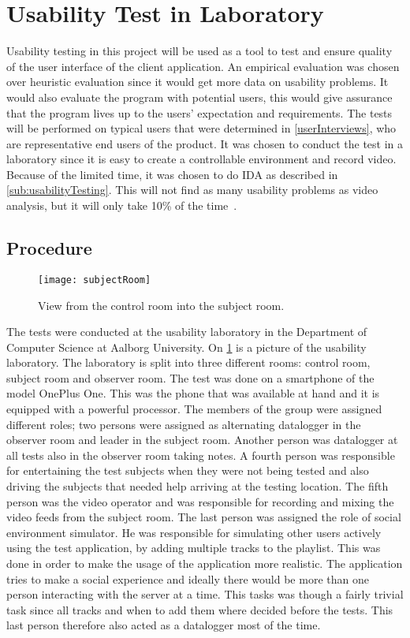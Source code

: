 \section{Usability Test in Laboratory}
Usability testing in this project will be used as a tool to test and
ensure quality of the user interface of the client application. An empirical evaluation was chosen over heuristic evaluation since it would get more data on usability problems. It would also evaluate the program with potential users, this would give assurance that the program lives up to the users' expectation and requirements. The tests will be performed on
typical users that were determined in \cref{userInterviews}, who are
representative end users of the product. It was chosen to conduct the
test in a laboratory since it is easy to create a controllable
environment and record video. Because of the limited time, it was
chosen to do IDA as described in \cref{sub:usabilityTesting}.  This will not find as many usability problems as video analysis, but it will only take 10\% of the time~\cite{kjeldskov2004instant}.

\subsection{Procedure}
\begin{figure}[hbtp]
  \centering
  \texttt{[image: subjectRoom]}
  \caption{View from the control room into the subject room.}\label{fig:subjectRoom}
\end{figure}

The tests were conducted at the usability laboratory in the Department of Computer Science at Aalborg University. On \cref{fig:subjectRoom} is a picture of the usability laboratory. The laboratory is split into three different rooms: control room, subject room and observer room. The test was done on a smartphone of the model OnePlus One. This was the phone that was available at hand and it is equipped with a powerful processor. The members of the group were assigned different roles; two persons were assigned as alternating datalogger in the observer room and leader in the subject room. Another person was datalogger at all tests also in the observer room taking notes. A fourth person was responsible for entertaining the test subjects when they were not being tested and also driving the subjects that needed help arriving at the testing location. The fifth person was the video operator and was responsible for recording and mixing the video feeds from the subject room. The last person was assigned the role of social environment simulator. He was responsible for simulating other users actively using the test application, by adding multiple tracks to the playlist. This was done in order to make the usage of the application more realistic. The application tries to make a social experience and ideally there would be more than one person interacting with the server at a time. This tasks was though a fairly trivial task since all tracks and when to add them where decided before the tests. This last person therefore also acted as a datalogger most of the time.

